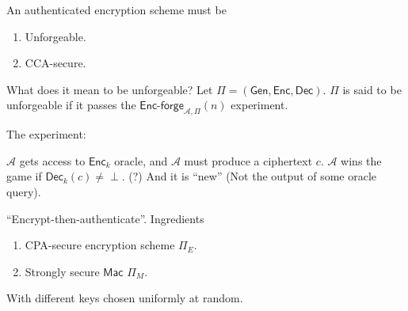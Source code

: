 \documentclass[12pt]{article}
\newcommand{\AAA}{\mathcal{A}}
\newcommand{\Enc}{\mathsf{Enc}}
\newcommand{\Dec}{\mathsf{Dec}}
\newcommand{\Mac}{\mathsf{Mac}}
\newcommand{\Encf}{\mathsf{Enc\text{-}forge}}
\newcommand{\Gen}{\mathsf{Gen}}
\newcommand{\GenEncDec}{(\Gen,\Enc,\Dec)}
\begin{document}
An authenticated encryption scheme must be\begin{enumerate}

\item Unforgeable.

\item CCA-secure.

\end{enumerate}

What does it mean to be unforgeable? Let $\Pi=\GenEncDec$. $\Pi$ is said to be unforgeable if it passes the $\Encf_{\AAA,\Pi}(n)$ experiment.

The experiment:

$\AAA$ gets access to $\Enc_k$ oracle, and $\AAA$ must produce a ciphertext $c$. $\AAA$ wins the game if $\Dec_k(c)\neq\perp$. (?) And it is ``new'' (Not the output of some oracle query).

``Encrypt-then-authenticate''. Ingredients\begin{enumerate}

\item CPA-secure encryption scheme $\Pi_E$.

\item Strongly secure $\Mac$ $\Pi_M$.

\end{enumerate}

With different keys chosen uniformly at random.
\end{document}
